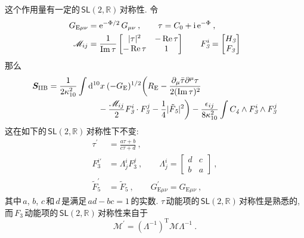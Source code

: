 这个作用量有一定的$\,\textsf{SL}(2,\mathds{R})\,$对称性. 令
\begin{subequations}
    \begin{align}
        G_{\mathrm{E}\mu\nu}&=\mathrm{e}^{-\Phi/2}\,G_{\mu\nu}\:,\qquad  \tau = C_{0}+\mathrm{i}\,\mathrm{e}^{-\Phi} \:, \label{12.1.30a} \\
        \mathscr{M}_{ij} &= \frac{1}{\operatorname{Im}\tau}
        \begin{bmatrix}
            \lvert\tau \rvert^{2} & -\operatorname{Re}\tau \\
            -\operatorname{Re}\tau & 1
        \end{bmatrix} \qquad 
        F_{\textit{3}}^{i} = \begin{bmatrix}
            H_{\textit{3}} \\ F_{\textit{3}} \label{12.1.30b}
        \end{bmatrix}
    \end{align} \label{12.1.30}
\end{subequations}
那么
\begin{align}
    \bm{S}_{\text{IIB}} &= \frac{1}{2\kappa_{10}^{2}}\int\mathrm{d}^{10}x\:(-G_{\mathrm{E}})^{1/2} \biggl( R_{\mathrm{E}} -\frac{\partial_{\mu}\bar{\tau}\partial^{\mu}\tau}{2(\operatorname{Im}\tau)^{2}} \nonumber\\
    &\qquad\qquad\qquad -\frac{\mathscr{M}_{ij}}{2}F_{\textit{3}}^{i}\cdot F_{\textit{3}}^{j}-\frac{1}{4}\lvert\tilde{F}_{\textit{5}}\rvert^{2}\biggr)-\frac{\epsilon_{ij}}{8\kappa_{10}^{2}}\int C_{\textit{4}}\wedge
    F_{\textit{3}}^{i}\wedge F_{\textit{3}}^{j} \label{12.1.31}
\end{align}
这在如下的$\,\textsf{SL}(2,\mathds{R})\,$对称性下不变:
\begin{subequations}
    \begin{align}
        \tau^{\prime} &=\frac{a\tau+b}{c\tau+d} \:, \label{12.1.32a} \\
        F_{\textit{3}}^{i\prime} &=\Lambda^{i}_{j}F_{\textit{3}}^{j}\:, \qquad  \Lambda^{i}_{j}=\begin{bmatrix}
            d & c \\ b & a
        \end{bmatrix} \:, \label{12.1.32b} \\
        \tilde{F}_{\textit{5}}^{\prime}&=\tilde{F}_{\textit{5}} \:, \qquad
        G_{\mathrm{E}\mu\nu}^{\prime}=G_{\mathrm{E}\mu\nu}\:, \label{12.1.32c}
    \end{align} \label{12.1.32}
\end{subequations}
其中$\,a$, $b$, $c\,$和$\,d\,$是满足$\,ad-bc=1\,$的实数. $\tau\,$动能项的$\,\textsf{SL}(2,\mathds{R})\,$对称性是熟悉的, 而$\,F_{\textit{3}}\,$动能项的$\,\textsf{SL}(2,\mathds{R})\,$对称性来自于
\begin{equation}
    \mathscr{M}^{\prime} = (\Lambda^{-1})^{\mathrm{T}}\mathscr{M}\Lambda^{-1} \:. \label{12.1.33}
\end{equation}

